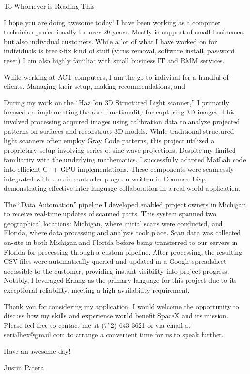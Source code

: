 
To Whomever is Reading This

\smallskip

I hope you are doing awesome today!
I have been working as a computer technician professionally for over 20 years.
Mostly in support of small businesses, but also individual customers.
While a lot of what I have worked on for individuals is break-fix kind of stuff (virus removal, software install, password reset) I am also highly familiar with small business IT and RMM services.

\smallskip

While working at ACT computers, I am the go-to indiviual for a handful of clients.
Managing their setup, making recommendations, and

\smallskip

During my work on the ``Haz Ion 3D Structured Light scanner,'' I primarily focused on implementing the core functionality for capturing 3D images.
This involved processing acquired images using calibration data to analyze projected patterns on surfaces and reconstruct 3D models.
While traditional structured light scanners often employ Gray Code patterns, this project utilized a proprietary setup involving series of sine-wave projections.
Despite my limited familiarity with the underlying mathematics, I successfully adapted MatLab code into efficient C++ GPU implementations.
These components were seamlessly integrated with a main controller program written in Common Lisp, demonstrating effective inter-language collaboration in a real-world application.

\smallskip

The ``Data Automation'' pipeline I developed enabled project owners in Michigan to receive real-time updates of scanned parts.
This system spanned two geographical locations: Michigan, where initial scans were conducted, and Florida, where data processing and analysis took place.
Scan data was collected on-site in both Michigan and Florida before being transferred to our servers in Florida for processing through a custom pipeline.
After processing, the resulting CSV files were automatically queried and updated in a Google spreadsheet accessible to the customer, providing instant visibility into project progress.
Notably, I leveraged Erlang as the primary language for this project due to its exceptional reliability, meeting a high-availability requirement.

\smallskip

Thank you for considering my application.
I would welcome the opportunity to discuss how my skills and experience would benefit SpaceX and its mission.
Please feel free to contact me at (772) 643-3621 or via email at serialhex@gmail.com to arrange a convenient time for us to speak further.

\smallskip

Have an awesome day!

Justin Patera
